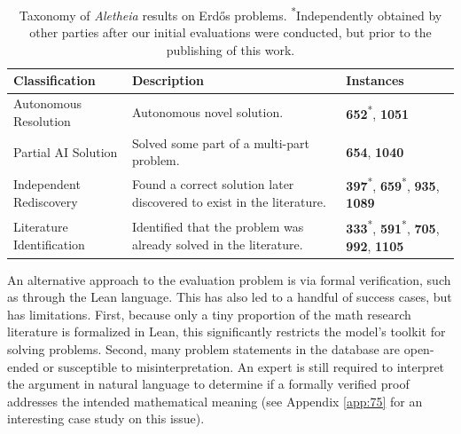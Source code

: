 \documentclass{article}
\theoremstyle{plain}
\theoremstyle{definition}
\newcommand{\Aletheia}{\emph{Aletheia}}
\begin{document}
\begin{table}[ht]
  \centering

  \begin{tabularx}{\textwidth}{
    @{}
    >{\raggedright\arraybackslash}p{3cm}
    X
    >{\raggedright\arraybackslash}p{2.8cm}
    @{}
  }
    \toprule
    \textbf{Classification} & \textbf{Description} & \textbf{Instances} \\
    \midrule

    Autonomous Resolution &
    Autonomous novel solution. &
    \mbox{\textbf{652}\textsuperscript{*}}, \mbox{\textbf{1051}} \\
    \addlinespace

    Partial AI Solution &
    Solved some part of a multi-part problem. &
    \mbox{\textbf{654}}, \mbox{\textbf{1040}} \\
    \addlinespace

    Independent Rediscovery &
    Found a correct solution later discovered to exist in the literature. &
    \mbox{\textbf{397}\textsuperscript{*}}, \mbox{\textbf{659}\textsuperscript{*}}, \mbox{\textbf{935}}, \mbox{\textbf{1089}} \\
    \addlinespace

    Literature Identification &
    Identified that the problem was already solved in the literature. &
    \mbox{\textbf{333}\textsuperscript{*}}, \mbox{\textbf{591}\textsuperscript{*}}, \mbox{\textbf{705}}, \newline
    \mbox{\textbf{992}}, \mbox{\textbf{1105}} \\
    \bottomrule
  \end{tabularx}
  \caption{Taxonomy of {\Aletheia} results on Erd\H{o}s problems. \textsuperscript{*}Independently obtained by other parties 
  after our initial evaluations were conducted, but prior to the publishing of this work.}\label{table:aletheia_erdos_solutions}
\end{table}


An alternative approach to the evaluation problem is via formal verification, such as through the Lean language. This has also led to a handful of success cases, but has limitations. First, because only a tiny proportion of the math research literature is formalized in Lean, this significantly restricts the model's toolkit for solving problems. Second, many problem statements in the database are open-ended or susceptible to misinterpretation. An expert is still required to interpret the argument in natural language to determine if a formally verified proof addresses the intended mathematical meaning (see Appendix \ref{app:75} for an interesting case study on this issue). 
\end{document}
